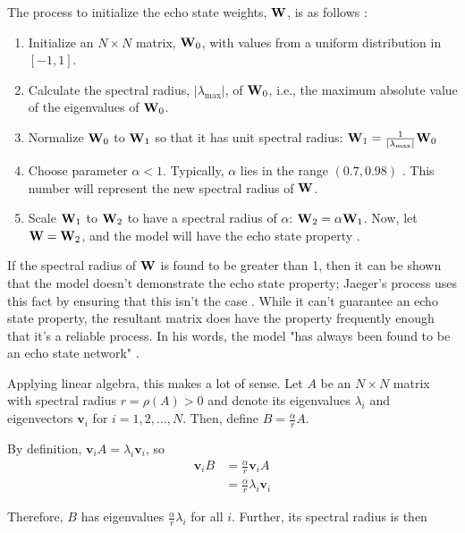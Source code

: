 \documentclass{article}
\begin{document}
The process to initialize the echo state weights, $\mathbf{W}$, is as follows \cite{jaeger2002tutorial}:

\newcommand{\specrad}{\vert \lambda_\text{max} \vert}
\begin{enumerate}
    \item Initialize an $N \times N$ matrix, $\mathbf{W}_0$, with values from a 
    uniform distribution in $[-1, 1]$.
    \item Calculate the spectral radius, $\specrad$, of $\mathbf{W}_0$, i.e., the 
    maximum absolute value of the eigenvalues of $\mathbf{W}_0$.
    \item Normalize $\mathbf{W}_0$ to $\mathbf{W}_1$ so that it has unit spectral radius:
    $\W_1 = \frac{1}{\specrad} \W_0$
    \item Choose parameter $\alpha < 1$. Typically, $\alpha$ lies in
    the range $(0.7, 0.98)$ \cite{jaeger2002tutorial}. This number will 
    represent the new spectral radius of $\mathbf{W}$.
    \item Scale $\mathbf{W}_1$ to $\mathbf{W}_2$ to have a spectral radius of
    $\alpha$: $\mathbf{W}_2 = \alpha \mathbf{W}_1$. Now, let $\mathbf{W} = \mathbf{W}_2$, and the model
    will have the echo state property \cite{jaeger2002tutorial}.
\end{enumerate}

If the spectral radius of $\mathbf{W}$ is found to be greater than 1, then it can 
be shown that the model doesn't demonstrate the echo state property; 
Jaeger's process uses this fact by ensuring that this isn't the case 
\cite{jaeger2002tutorial}. While it can't guarantee an echo state property,
the resultant matrix does have the property frequently enough that it's a
reliable process. In his words, the model "has always been found to be an 
echo state network" \cite{jaeger2002tutorial}.

\newcommand{\vv}{\mathbf{v}}

Applying linear algebra, this makes a lot of sense. Let $A$ be an
$N \times N$ matrix with spectral radius $r = \rho(A) > 0$ and denote its
eigenvalues $\lambda_i$ and eigenvectors $\vv_i$ for
$i = 1, 2, \dots, N$.  Then, define $B = \frac{\alpha}{r} A$.

By definition, $\vv_i A = \lambda_i \vv_i$, so 
\begin{align*}
   \vv_i B &= \frac{\alpha}{r} \vv_i A \\
   &= \frac{\alpha}{r} \lambda_i \vv_i
\end{align*}

Therefore, $B$ has eigenvalues $\frac{\alpha}{r} \lambda_i$ for all $i$. 
Further, its spectral radius is then
\end{document}
